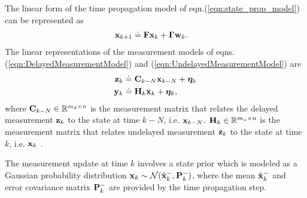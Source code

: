 The linear form of the time propagation model of eqn.(\ref{eqn:state_prop_model}) can be represented as
\begin{align}
	\label{eqn:state_prop_model}
	\mathbf{x}_{k+1} &\doteq \mathbf{F} \mathbf{x}_k + \boldsymbol{\Gamma} \mathbf{w}_k.
\end{align}
The linear representations of the measurement models of eqns. (\ref{eqn:DelayedMeasurementModel}) and (\ref{eqn:UndelayedMeasurementModel}) are
\begin{align}
	\label{eqn:eqn:LinearDelayedMeasurementModel}
	\mathbf{z}_k &\doteq \mathbf{C}_{k-N} \mathbf{x}_{k-N} + \boldsymbol{\eta}_k \\
	\label{eqn:LinearUndelayedMeasurementModel}
	\mathbf{y}_k &\doteq \mathbf{H}_k \mathbf{x}_k + \boldsymbol{\eta}_k,
\end{align}
where $\mathbf{C}_{k-N} \in \mathbb{R}^{m_d \times n}$ is the measurement matrix that relates the delayed measurement $\mathbf{z}_{k}$ to the state at time $k-N$, i.e. $\mathbf{x}_{k-N}$. 
$\mathbf{H}_k\in \mathbb{R}^{m_u \times n}$ is the measurement matrix that relates undelayed measurement $\mathbf{z}_k$ to the state at time $k$, i.e. $\mathbf{x}_k$ .

The measurement update at time $k$ involves a state prior which is modeled as a Gaussian probability distribution $\mathbf{x}_k \sim \mathcal{N}(\hat{\mathbf{x}}_k^-,\mathbf{P}_k^-)$, where the mean $\hat{\mathbf{x}}_k^-$ and error covariance matrix $\mathbf{P}_k^-$ are provided by the time propagation step.
